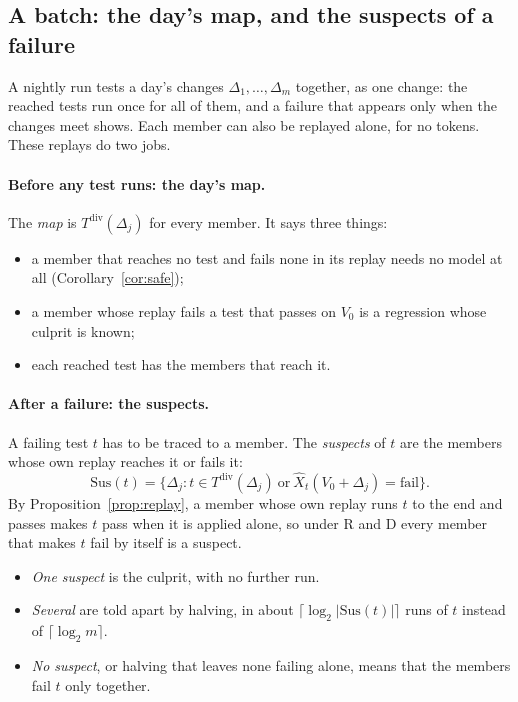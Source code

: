 \documentclass[11pt,a4paper]{article}
\begin{document}
\subsection{A batch: the day's map, and the suspects of a failure}
\label{sec:suspects}

A nightly run tests a day's changes $\Delta_1, \dots, \Delta_m$ together, as one change: the reached tests run once
for all of them, and a failure that appears only when the changes meet shows. Each member can also be replayed
alone, for no tokens. These replays do two jobs.

\paragraph{Before any test runs: the day's map.} The \emph{map} is $T^{\mathrm{div}}(\Delta_j)$ for every member.
It says three things:
\begin{itemize}
  \item a member that reaches no test and fails none in its replay needs no model at all
        (Corollary~\ref{cor:safe});
  \item a member whose replay fails a test that passes on $V_0$ is a regression whose culprit is known;
  \item each reached test has the members that reach it.
\end{itemize}

\paragraph{After a failure: the suspects.} A failing test $t$ has to be traced to a member. The \emph{suspects}
of $t$ are the members whose own replay reaches it or fails it:
\begin{equation}
  \mathrm{Sus}(t) = \{\Delta_j : t \in T^{\mathrm{div}}(\Delta_j) \ \text{or} \ \hat{X}_t(V_0 + \Delta_j) =
  \text{fail}\}.
  \label{eq:suspects}
\end{equation}
By Proposition~\ref{prop:replay}, a member whose own replay runs $t$ to the end and passes makes $t$ pass when it
is applied alone, so under R and D every member that makes $t$ fail by itself is a suspect.
\begin{itemize}
  \item \emph{One suspect} is the culprit, with no further run.
  \item \emph{Several} are told apart by halving, in about $\lceil \log_2 |\mathrm{Sus}(t)| \rceil$ runs of $t$
        instead of $\lceil \log_2 m \rceil$.
  \item \emph{No suspect}, or halving that leaves none failing alone, means that the members fail $t$ only
        together.
\end{itemize}
\end{document}
